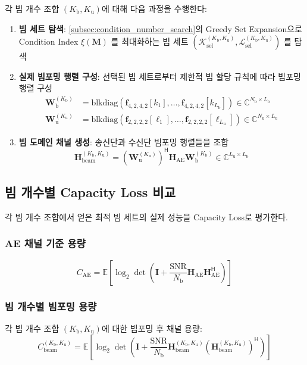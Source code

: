 \documentclass[10pt]{article}
\begin{document}
각 빔 개수 조합 $(K_{\text{b}}, K_{\text{u}})$에 대해 다음 과정을 수행한다:
\begin{enumerate}
\item \textbf{빔 세트 탐색}: \ref{subsec:condition_number_search}의 Greedy Set Expansion으로 Condition Index $\xi(\mathbf{M})$ 를 최대화하는 빔 세트 $(\mathcal{K}_{\text{sel}}^{(K_{\text{b}}, K_{\text{u}})}, \mathcal{L}_{\text{sel}}^{(K_{\text{b}}, K_{\text{u}})})$ 를 탐색
\item \textbf{실제 빔포밍 행렬 구성}: 선택된 빔 세트로부터 제한적 빔 할당 규칙에 따라 빔포밍 행렬 구성
\begin{align}
\mathbf{W}_{\text{b}}^{(K_{\text{b}})} &= \text{blkdiag}\left(\mathbf{f}_{4,2,4,2}[k_1], \ldots, \mathbf{f}_{4,2,4,2}[k_{L_{\text{b}}}]\right) \in \mathbb{C}^{N_{\text{b}} \times L_{\text{b}}} \\
\mathbf{W}_{\text{u}}^{(K_{\text{u}})} &= \text{blkdiag}\left(\mathbf{f}_{2,2,2,2}[\ell_1], \ldots, \mathbf{f}_{2,2,2,2}[\ell_{L_{\text{u}}}]\right) \in \mathbb{C}^{N_{\text{u}} \times L_{\text{u}}}
\end{align}
\item \textbf{빔 도메인 채널 생성}: 송신단과 수신단 빔포밍 행렬들을 조합
\begin{equation}
\mathbf{H}_{\text{beam}}^{(K_{\text{b}}, K_{\text{u}})} = (\mathbf{W}_{\text{u}}^{(K_{\text{u}})})^{\mathsf{H}} \mathbf{H}_{\text{AE}} \mathbf{W}_{\text{b}}^{(K_{\text{b}})} \in \mathbb{C}^{L_{\text{u}} \times L_{\text{b}}}
\end{equation}
\end{enumerate}

\subsection{빔 개수별 Capacity Loss 비교}
각 빔 개수 조합에서 얻은 최적 빔 세트의 실제 성능을 Capacity Loss로 평가한다.

\subsubsection{AE 채널 기준 용량}
\begin{equation}
C_{\text{AE}} = \mathbb{E}\left[\log_2 \det\left(\mathbf{I} + \frac{\text{SNR}}{N_{\text{b}}} \mathbf{H}_{\text{AE}} \mathbf{H}_{\text{AE}}^{\mathsf{H}}\right)\right]
\end{equation}

\subsubsection{빔 개수별 빔포밍 용량}
각 빔 개수 조합 $(K_{\text{b}}, K_{\text{u}})$에 대한 빔포밍 후 채널 용량:
\begin{equation}
C_{\text{beam}}^{(K_{\text{b}}, K_{\text{u}})} = \mathbb{E}\left[\log_2 \det\left(\mathbf{I} + \frac{\text{SNR}}{N_{\text{b}}} \mathbf{H}_{\text{beam}}^{(K_{\text{b}}, K_{\text{u}})} (\mathbf{H}_{\text{beam}}^{(K_{\text{b}}, K_{\text{u}})})^{\mathsf{H}}\right)\right]
\end{equation}
\end{document}
